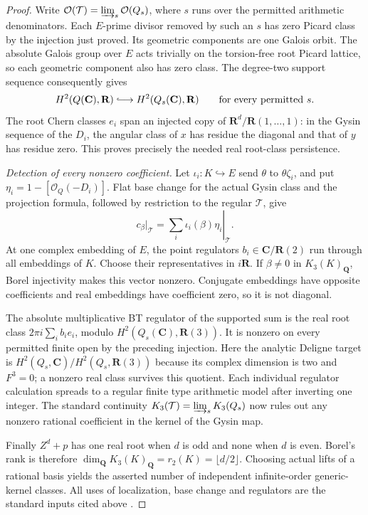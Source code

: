 \documentclass[11pt,a4paper]{article}
\theoremstyle{remark}
\newcommand{\Q}{\mathbf Q}
\newcommand{\R}{\mathbf R}
\newcommand{\C}{\mathbf C}
\begin{document}
\begin{proof}
Write $\mathcal O(\mathcal T)=\varinjlim_s\mathcal O(Q_s)$,
where $s$ runs over the permitted arithmetic denominators.
Each $E$-prime divisor removed by such an $s$ has zero Picard
class by the injection just proved. Its geometric components
are one Galois orbit. The absolute Galois group over $E$ acts trivially on the torsion-free
root Picard lattice, so each geometric component also has zero
class. The degree-two support sequence consequently gives
\[
 H^2(Q(\C),\R)\lhook\joinrel\longrightarrow
 H^2(Q_s(\C),\R)\qquad\text{for every permitted }s.
\]
The root Chern classes $e_i$ span an injected copy of
$\R^d/\R(1,\ldots,1)$: in the Gysin sequence of the $D_i$,
the angular class of $x$ has residue the diagonal and that of
$y$ has residue zero. This proves precisely the needed real
root-class persistence.

\emph{Detection of every nonzero coefficient.}
Let $\iota_i:K\hookrightarrow E$ send $\theta$ to
$\theta\zeta_i$, and put $\eta_i=1-[\mathcal O_Q(-D_i)]$.
Flat base change for the actual Gysin class and the projection
formula, followed by restriction to the regular $\mathcal T$,
give
\[
 c_\beta|_{\mathcal T}
    =\left.\sum_i\iota_i(\beta)\eta_i\right|_{\mathcal T}.
\]
At one complex embedding of $E$, the point regulators
$b_i\in\C/\R(2)$ run through all embeddings of $K$.
Choose their representatives in $i\R$. If $\beta\ne0$ in
$K_3(K)_{\Q}$, Borel injectivity makes this vector nonzero.
Conjugate embeddings have opposite coefficients and real
embeddings have coefficient zero, so it is not diagonal.

The absolute multiplicative BT regulator of the supported sum
is the real root class $2\pi i\sum_i b_i e_i$, modulo
$H^2(Q_s(\C),\R(3))$. It is nonzero on every permitted finite
open by the preceding injection. Here the analytic Deligne
target is $H^2(Q_s,\C)/H^2(Q_s,\R(3))$ because its complex
dimension is two and $F^3=0$; a nonzero real class survives this
quotient. Each individual regulator calculation spreads to a
regular finite type arithmetic model after inverting one
integer. The standard continuity
$K_3(\mathcal T)=\varinjlim_s K_3(Q_s)$ now rules out any
nonzero rational coefficient in the kernel of the Gysin map.

Finally $Z^d+p$ has one real root when $d$ is odd and none
when $d$ is even. Borel's rank is therefore
$\dim_{\Q}K_3(K)_{\Q}=r_2(K)=\lfloor d/2\rfloor$.
Choosing actual lifts of a rational basis yields the asserted
number of independent infinite-order generic-kernel classes.
All uses of localization, base change and regulators are the
standard inputs cited above \cite{Quillen,QuillenFinite,Borel,BunkeTamme,Weibel}.
\end{proof}
\end{document}
